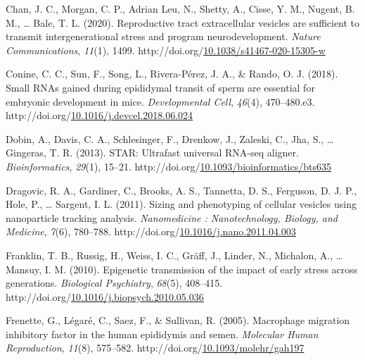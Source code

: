 \documentclass[12pt,twoside]{reedthesis}
\newlength{\cslhangindent}
\newenvironment{CSLReferences}[2] %
 {%
  \setlength{\parindent}{0pt}
  \ifodd #1 \everypar{\setlength{\hangindent}{\cslhangindent}}\ignorespaces\fi
  \ifnum #2 > 0
  \setlength{\parskip}{#2\baselineskip}
  \fi
 }%
 {}
\begin{document}
\begin{CSLReferences}{1}{0}
\leavevmode{}%
Chan, J. C., Morgan, C. P., Adrian Leu, N., Shetty, A., Cisse, Y. M., Nugent, B. M., \ldots{} Bale, T. L. (2020). Reproductive tract extracellular vesicles are sufficient to transmit intergenerational stress and program neurodevelopment. \emph{Nature Communications}, \emph{11}(1), 1499. http://doi.org/\href{https://doi.org/10.1038/s41467-020-15305-w}{10.1038/s41467-020-15305-w}

\leavevmode{}%
Conine, C. C., Sun, F., Song, L., Rivera-Pérez, J. A., \& Rando, O. J. (2018). Small {RNAs} gained during epididymal transit of sperm are essential for embryonic development in mice. \emph{Developmental Cell}, \emph{46}(4), 470--480.e3. http://doi.org/\href{https://doi.org/10.1016/j.devcel.2018.06.024}{10.1016/j.devcel.2018.06.024}

\leavevmode{}%
Dobin, A., Davis, C. A., Schlesinger, F., Drenkow, J., Zaleski, C., Jha, S., \ldots{} Gingeras, T. R. (2013). {STAR}: Ultrafast universal {RNA}-seq aligner. \emph{Bioinformatics}, \emph{29}(1), 15--21. http://doi.org/\href{https://doi.org/10.1093/bioinformatics/bts635}{10.1093/bioinformatics/bts635}

\leavevmode{}%
Dragovic, R. A., Gardiner, C., Brooks, A. S., Tannetta, D. S., Ferguson, D. J. P., Hole, P., \ldots{} Sargent, I. L. (2011). Sizing and phenotyping of cellular vesicles using nanoparticle tracking analysis. \emph{Nanomedicine : Nanotechnology, Biology, and Medicine}, \emph{7}(6), 780--788. http://doi.org/\href{https://doi.org/10.1016/j.nano.2011.04.003}{10.1016/j.nano.2011.04.003}

\leavevmode{}%
Franklin, T. B., Russig, H., Weiss, I. C., Gräff, J., Linder, N., Michalon, A., \ldots{} Mansuy, I. M. (2010). Epigenetic transmission of the impact of early stress across generations. \emph{Biological Psychiatry}, \emph{68}(5), 408--415. http://doi.org/\href{https://doi.org/10.1016/j.biopsych.2010.05.036}{10.1016/j.biopsych.2010.05.036}

\leavevmode{}%
Frenette, G., Légaré, C., Saez, F., \& Sullivan, R. (2005). Macrophage migration inhibitory factor in the human epididymis and semen. \emph{Molecular Human Reproduction}, \emph{11}(8), 575--582. http://doi.org/\href{https://doi.org/10.1093/molehr/gah197}{10.1093/molehr/gah197}


\end{CSLReferences}
\end{document}
